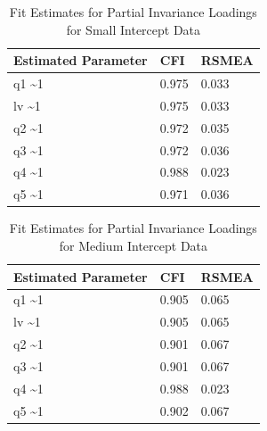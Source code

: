 \documentclass[
  man,floatsintext]{apa7}
\begin{document}
\begin{table}[tbp]

\begin{center}
\begin{threeparttable}

\caption{\label{tab:p-tab15}Fit Estimates for Partial Invariance Loadings for Small Intercept Data}

\begin{tabular}{lll}
\toprule
Estimated Parameter & CFI & RSMEA\\
\midrule
q1 \textasciitilde{}1 & 0.975 & 0.033\\
lv \textasciitilde{}1 & 0.975 & 0.033\\
q2 \textasciitilde{}1 & 0.972 & 0.035\\
q3 \textasciitilde{}1 & 0.972 & 0.036\\
q4 \textasciitilde{}1 & 0.988 & 0.023\\
q5 \textasciitilde{}1 & 0.971 & 0.036\\
\bottomrule
\end{tabular}

\end{threeparttable}
\end{center}

\end{table}

\begin{table}[tbp]

\begin{center}
\begin{threeparttable}

\caption{\label{tab:p-tab16}Fit Estimates for Partial Invariance Loadings for Medium Intercept Data}

\begin{tabular}{lll}
\toprule
Estimated Parameter & CFI & RSMEA\\
\midrule
q1 \textasciitilde{}1 & 0.905 & 0.065\\
lv \textasciitilde{}1 & 0.905 & 0.065\\
q2 \textasciitilde{}1 & 0.901 & 0.067\\
q3 \textasciitilde{}1 & 0.901 & 0.067\\
q4 \textasciitilde{}1 & 0.988 & 0.023\\
q5 \textasciitilde{}1 & 0.902 & 0.067\\
\bottomrule
\end{tabular}

\end{threeparttable}
\end{center}

\end{table}
\end{document}
